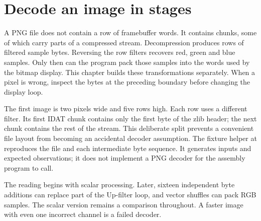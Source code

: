 \section{Decode an image in stages}
A PNG file does not contain a row of framebuffer words. It contains chunks, some of
which carry parts of a compressed stream. Decompression produces rows of filtered
sample bytes. Reversing the row filters recovers red, green and blue samples. Only
then can the program pack those samples into the words used by the bitmap display.
This chapter builds these transformations separately. When a pixel is wrong, inspect
the bytes at the preceding boundary before changing the display loop.

The first image is two pixels wide and five rows high. Each row uses a different
filter. Its first IDAT chunk contains only the first byte of the zlib header; the next
chunk contains the rest of the stream. This deliberate split prevents a convenient
file layout from becoming an accidental decoder assumption. The fixture helper at
 reproduces the file and each intermediate byte
sequence. It generates inputs and expected observations; it does not implement a
PNG decoder for the assembly program to call.

The reading begins with scalar processing. Later, sixteen independent byte additions
can replace part of the Up-filter loop, and vector shuffles can pack RGB samples.
The scalar version remains a comparison throughout. A faster image with even one
incorrect channel is a failed decoder.
